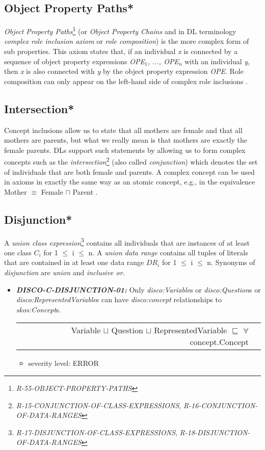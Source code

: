 \documentclass{llncs}
\newenvironment{DL}{
  \vspace{0cm}
  \begin{tabular}{r l}

}{
  \end{tabular}
}
\begin{document}
\subsection{Object Property Paths*}

\emph{Object Property Paths}\footnote{\emph{R-55-OBJECT-PROPERTY-PATHS}} (or \emph{Object Property Chains} and in DL terminology \emph{complex role inclusion axiom} or \emph{role composition}) is the more complex form of sub properties. 
This axiom states that, if an individual \emph{x} is connected by a sequence of object property expressions \emph{OPE$_1$, ..., OPE$_n$} with an individual \emph{y}, then \emph{x} is also connected with \emph{y} by the object property expression \emph{OPE}.  
Role composition can only appear on the left-hand side of complex role inclusions \cite{Kroetzsch2012}.

\subsection{Intersection*}

Concept inclusions allow us to state that all mothers are female and that
all mothers are parents, but what we really mean is that mothers are exactly the female
parents. DLs support such statements by allowing us to form complex concepts such as
the \emph{intersection}\footnote{\emph{R-15-CONJUNCTION-OF-CLASS-EXPRESSIONS}, \emph{R-16-CONJUNCTION-OF-DATA-RANGES}} (also called \emph{conjunction})
which denotes the set of individuals that are both female and parents. A complex concept
can be used in axioms in exactly the same way as an atomic concept, e.g., in the
equivalence Mother $\equiv$ Female $\sqcap$ Parent .

\subsection{Disjunction*}

A \emph{union class expression}\footnote{{\em R-17-DISJUNCTION-OF-CLASS-EXPRESSIONS}, {\em R-18-DISJUNCTION-OF-DATA-RANGES}} contains all individuals that are instances of at least one class $C_{i}$ for 1 $\leq$ i $\leq$ n. 
A \emph{union data range} contains all tuples of literals that are contained in at least one data range $DR_{i}$ for 1 $\leq$ i $\leq$ n.
Synonyms of {\em disjunction} are {\em union} and {\em inclusive or}.

\begin{itemize}
	\item \textbf{{\em DISCO-C-DISJUNCTION-01:}} 
Only {\em disco:Variable}s or {\em disco:Question}s or {\em disco:RepresentedVariable}s can have {\em disco:concept} relationships to {\em skos:Concept}s.

\begin{DL}
Variable $\sqcup$ Question $\sqcup$ RepresentedVariable $\sqsubseteq$ $\forall$ concept.Concept \\
\end{DL}
\begin{itemize}
	\item severity level: ERROR
\end{itemize}
\end{itemize}
\end{document}
